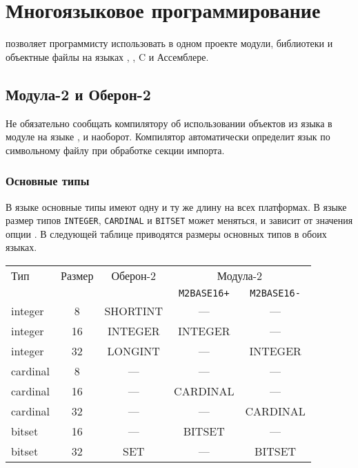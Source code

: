 %

\chapter{Многоязыковое программирование}\label{multilang}

\xds{} позволяет программисту использовать в одном проекте
модули, библиотеки и объектные файлы на языках
\mt{}, \ot{}, C и Ассемблере.

\section{Модула-2 и Оберон-2}\label{multilang:m2o2}

Не обязательно сообщать компилятору об использовании объектов 
из языка \mt{} в модуле на языке
\ot{}, и наоборот. Компилятор автоматически определит язык по 
символьному файлу при обработке секции импорта.

\subsection{Основные типы}

В языке \ot{} основные типы имеют одну и ту же длину на всех платформах.
В языке
\mt{} размер типов {\tt INTEGER}, {\tt CARDINAL} и {\tt BITSET} 
может меняться, и зависит от значения опции
.
В следующей таблице приводятся размеры основных типов в обоих языках.
\begin{center}
\begin{tabular}{|l|c|c|c|c|} \hline
Тип      & Размер & Оберон-2  & \multicolumn{2}{c|}{Модула-2}     \\
         &      &           & {\tt M2BASE16+} & {\tt M2BASE16-} \\ \hline
integer  & 8    &  SHORTINT &   ---           &         ---     \\
integer  & 16   &  INTEGER  &   INTEGER       &         ---     \\
integer  & 32   &  LONGINT  &   ---           &       INTEGER   \\
cardinal & 8    &  ---      &   ---           &         ---     \\
cardinal & 16   &  ---      &   CARDINAL      &         ---     \\
cardinal & 32   &  ---      &   ---           &       CARDINAL  \\
bitset   & 16   &  ---      &   BITSET        &         ---     \\
bitset   & 32   &  SET      &   ---           &       BITSET    \\
\hline
\end{tabular}
\end{center}

